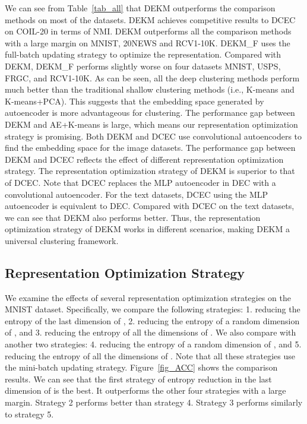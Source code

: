 We can see from Table~\ref{tab_all} that DEKM outperforms the comparison methods on most of the datasets. DEKM achieves competitive results to DCEC on COIL-20 in terms of NMI. DEKM outperforms all the comparison methods with a large margin on MNIST, 20NEWS and RCV1-10K. DEKM\_F uses the full-batch updating strategy to optimize the representation. Compared with DEKM, DEKM\_F performs slightly worse on four datasets MNIST, USPS, FRGC, and RCV1-10K. As can be seen, all the deep clustering methods perform much better than the traditional shallow clustering methods (i.e., K-means and K-means+PCA). This suggests that the embedding space generated by autoencoder is more advantageous for clustering. The performance gap between DEKM and AE+K-means is large, which means our representation optimization strategy is promising. Both DEKM and DCEC use convolutional autoencoders to find the embedding space for the image datasets. The performance gap between DEKM and DCEC reflects the effect of different representation optimization strategy. The representation optimization strategy of DEKM is superior to that of DCEC. Note that DCEC replaces the MLP autoencoder in DEC with a convolutional autoencoder. For the text datasets, DCEC using the MLP autoencoder is equivalent to DEC. Compared with DCEC on the text datasets, we can see that DEKM also performs better. Thus, the representation optimization strategy of DEKM works in different scenarios, making DEKM a universal clustering framework.

\subsection{Representation Optimization Strategy }

We examine the effects of several representation optimization strategies on the MNIST dataset. Specifically, we compare the following strategies: 1. reducing the entropy of the last dimension of , 2. reducing the entropy of a random dimension of , and 3. reducing the entropy of all the dimensions of . We also compare with another two strategies: 4. reducing the entropy of a random dimension of , and 5. reducing the entropy of all the dimensions of . Note that all these strategies use the mini-batch updating strategy. Figure~\ref{fig_ACC} shows the comparison results. We can see that the first strategy of entropy reduction in the last dimension of  is the best. It outperforms the other four strategies with a large margin. Strategy 2 performs better than strategy 4. Strategy 3 performs similarly to strategy 5.

